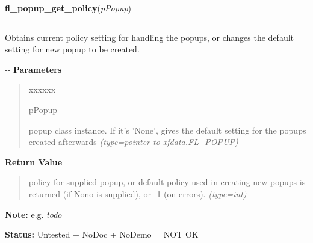 \hspace{.8\funcindent}\begin{boxedminipage}{\funcwidth}

    \raggedright \textbf{fl\_popup\_get\_policy}(\textit{pPopup})

    \vspace{-1.5ex}

    \rule{\textwidth}{0.5\fboxrule}
\setlength{\parskip}{2ex}

Obtains current policy setting for handling the popups, or changes
the default setting for new popup to be created.

-{}-
\setlength{\parskip}{1ex}
      \textbf{Parameters}
      \vspace{-1ex}

      \begin{quote}
        \begin{Ventry}{xxxxxx}

          \item[pPopup]


popup class instance. If it's 'None', gives the default setting for
the popups created afterwards
            {\it (type=pointer to xfdata.FL\_POPUP)}

        \end{Ventry}

      \end{quote}

      \textbf{Return Value}
    \vspace{-1ex}

      \begin{quote}

policy for supplied popup, or default policy used in creating
new popups is returned (if Nono is supplied), or -1 (on errors).
      {\it (type=int)}

      \end{quote}

\textbf{Note:} 
e.g. \emph{todo}


\textbf{Status:} 
Untested + NoDoc + NoDemo = NOT OK


    \end{boxedminipage}

    \label{xformslib:flpopup:fl_popup_set_policy}

    \vspace{0.5ex}

